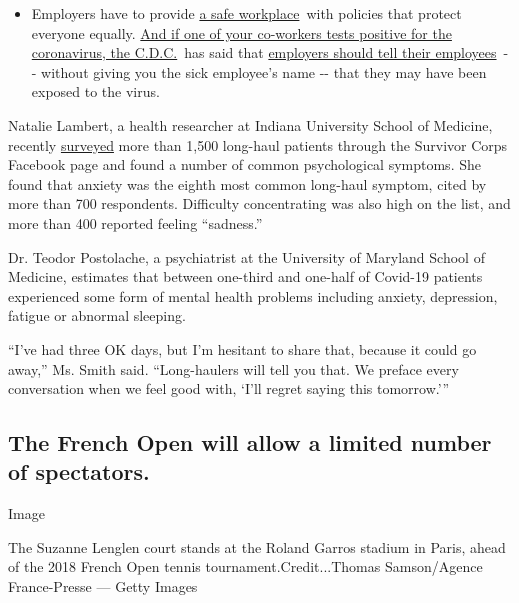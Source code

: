 \begin{itemize}
  \begin{itemize}
  \tightlist
  \item
    Employers have to provide
    \href{https://www.osha.gov/SLTC/covid-19/standards.html}{a safe
    workplace}~with policies that protect everyone equally.
    \href{https://www.nytimes3xbfgragh.onion/article/coronavirus-money-unemployment.html?action=click\&pgtype=Article\&state=default\&region=MAIN_CONTENT_3\&context=storylines_faq}{And
    if one of your co-workers tests positive for the coronavirus, the
    C.D.C.}~has said that
    \href{https://www.cdc.gov/coronavirus/2019-ncov/community/guidance-business-response.html}{employers
    should tell their employees}~-\/- without giving you the sick
    employee's name -\/- that they may have been exposed to the virus.
  \end{itemize}
\end{itemize}

Natalie Lambert, a health researcher at Indiana University School of
Medicine, recently
\href{https://precisionhealth.iu.edu/news-multimedia/_news/lambert-covid-symptom-study-doc.pdf}{surveyed}
more than 1,500 long-haul patients through the Survivor Corps Facebook
page and found a number of common psychological symptoms. She found that
anxiety was the eighth most common long-haul symptom, cited by more than
700 respondents. Difficulty concentrating was also high on the list, and
more than 400 reported feeling ``sadness.''

Dr. Teodor Postolache, a psychiatrist at the University of Maryland
School of Medicine, estimates that between one-third and one-half of
Covid-19 patients experienced some form of mental health problems
including anxiety, depression, fatigue or abnormal sleeping.

``I've had three OK days, but I'm hesitant to share that, because it
could go away,'' Ms. Smith said. ``Long-haulers will tell you that. We
preface every conversation when we feel good with, `I'll regret saying
this tomorrow.'''

\hypertarget{the-french-open-will-allow-a-limited-number-of-spectators}{%
\subsection{The French Open will allow a limited number of
spectators.}\label{the-french-open-will-allow-a-limited-number-of-spectators}}

Image

The Suzanne Lenglen court stands at the Roland Garros stadium in Paris,
ahead of the 2018 French Open tennis tournament.Credit...Thomas
Samson/Agence France-Presse --- Getty Images


